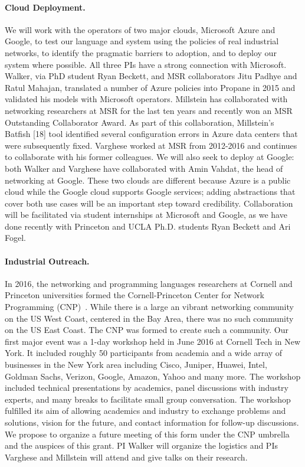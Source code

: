 \paragraph*{Cloud Deployment.} 
We will work with the operators of two major clouds, Microsoft Azure and Google, to test our language and system using the policies of real industrial networks, to identify the pragmatic barriers to adoption, and to deploy our system where possible.
All three PIs have a strong connection with Microsoft. Walker, via PhD student Ryan Beckett, and MSR collaborators Jitu Padhye and Ratul Mahajan, translated a number of Azure policies into Propane in 2015 and validated his models with Microsoft operators. Millstein has collaborated with networking researchers at MSR for the last ten years and recently won an MSR Outstanding Collaborator Award. As part of this collaboration, Millstein's Batfish [18] tool identified several configuration errors in Azure data centers that were subsequently fixed. Varghese worked at MSR from 2012-2016 and continues to collaborate with his former colleagues. We will also seek to deploy at Google: both Walker and Varghese have collaborated with Amin Vahdat, the head of networking at Google. These two clouds are different because Azure is a public cloud while the Google cloud supports Google services; adding abstractions that cover both use cases will be an important step toward credibility. Collaboration will be facilitated via student internships at Microsoft and Google, as we have done recently with Princeton and UCLA Ph.D. students Ryan Beckett and Ari Fogel.

\paragraph*{Industrial Outreach.}
In 2016, the networking and programming languages
researchers at Cornell and Princeton universities 
formed the Cornell-Princeton Center for Network 
Programming (CNP)~\cite{center-for-network-programming}.
While there is a large an vibrant networking community on the US
West Coast, centered in the Bay Area, there was no such community on
the US East Coast.  The CNP was formed to create such a community.
Our first major event was a 1-day workshop held in June 2016 at
Cornell Tech in New York.  It included roughly 50 participants from
academia and a wide array of businesses in the New York area including
Cisco, Juniper, Huawei, Intel, Goldman Sachs, Verizon, Google, Amazon,
Yahoo and many more.  The workshop included technical presentations by
academics, panel discussions with industry experts, and many breaks to
facilitate small group conversation.  The workshop fulfilled its aim
of allowing academics and industry to exchange problems and solutions,
vision for the future, and contact information for follow-up
discussions. We propose to organize a future meeting of this form
under the CNP umbrella and the auspices of this grant.  PI Walker will
organize the logistics and PIs Varghese and Millstein will attend and
give talks on their research.

